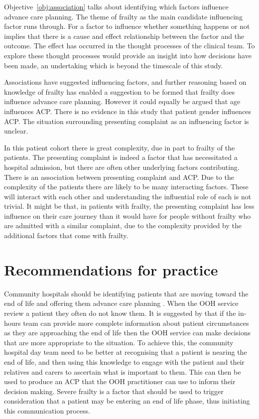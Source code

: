 \documentclass
[
	12pt,
	a4paper,
	oneside,
]{report}
\begin{document}
Objective~\ref{obj:association} talks about identifying which factors 
influence advance care planning.
The theme of frailty as the main candidate influencing factor runs through.
For a factor to influence whether something happens or not implies that there 
is a cause and effect relationship between the factor and the outcome. 
The effect has occurred in the thought processes of the clinical team. To 
explore these thought processes would provide an insight into how decisions
have been made, an undertaking which is beyond the timescale of this study.

Associations have suggested influencing factors, and further reasoning based
on knowledge of frailty has enabled a suggestion to be formed that frailty
does influence advance care planning. However it could equally be argued
that age influences ACP. There is no evidence in this study that patient
gender influences ACP. The situation surrounding presenting complaint as
an influencing factor is unclear.

In this patient cohort there is great complexity, due in part to frailty
of the patients. The presenting complaint is indeed a factor that has 
necessitated a hospital admission, but there are often other underlying
factors contributing. There is an association between presenting complaint
and ACP. Due to the complexity of the patients there are likely to be many
interacting factors. These will interact with each other and understanding
the influential role of each is not trivial.
It might be that, in patients with
frailty, the presenting complaint has less influence on their care journey than
it would have for people without frailty who are admitted with a similar
complaint, due to the complexity provided by the additional factors that
come with frailty.

\section{Recommendations for practice}

Community hospitals should be identifying patients that are moving toward the
end of life and offering them advance care planning \parencite{dh:09}.
When the OOH service review a patient they often do not know them. It is 
suggested by \textcite{brettell:18} that if the in-hours team can provide more
complete information about patient circumstances as they are approaching the
end of life then the OOH service can make decisions that are more appropriate
to the situation. To achieve this, the community hospital day team need to be 
better at recognising that a patient is nearing the end of life, and then 
using this knowledge to engage with the patient and their relatives and 
carers to ascertain what is important to them. This can then be used to 
produce an ACP that the OOH practitioner can use to inform their decision
making. Severe frailty is a factor that should be used to trigger consideration
that a patient may be entering an end of life phase, thus initiating this
communication process.
\end{document}

